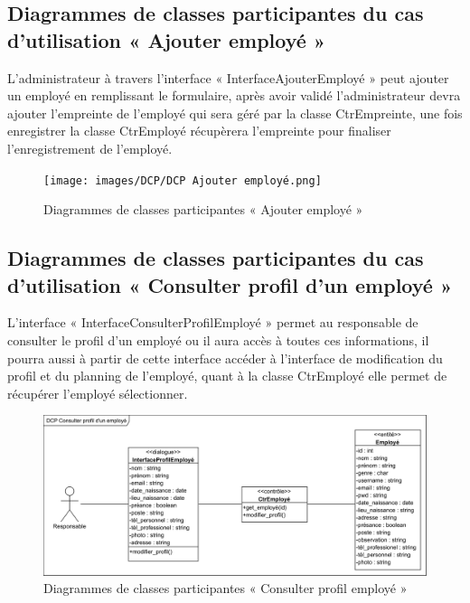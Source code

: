         \subsection*{Diagrammes de classes participantes du cas d'utilisation « Ajouter employé »}
        L’administrateur à travers l’interface « InterfaceAjouterEmployé » peut ajouter un employé en remplissant le formulaire, après avoir validé l’administrateur devra ajouter l’empreinte de l’employé qui sera géré par la classe CtrEmpreinte, une fois enregistrer la classe CtrEmployé récupèrera l’empreinte pour finaliser l’enregistrement de l’employé. 
        \clearpage
            \begin{figure}[h!]
                 \centering
                \texttt{[image: images/DCP/DCP Ajouter employé.png]}
                 \caption{Diagrammes de classes participantes « Ajouter employé »}
                 \label{fig31}
            \end{figure}
        
        \subsection*{Diagrammes de classes participantes du cas d'utilisation « Consulter profil d'un employé »}
        L’interface « InterfaceConsulterProfilEmployé » permet au responsable de consulter le profil d’un employé ou il aura accès à toutes ces informations, il pourra aussi à partir de cette interface accéder à l’interface de modification du profil et du planning de l’employé, quant à la classe CtrEmployé elle permet de récupérer l’employé sélectionner. 
            \begin{figure}[h!]
                 \centering
                \includegraphics[scale=0.72]{images/DCP/DCP_consulter_profil_d'un_employe.png}
                 \caption{Diagrammes de classes participantes « Consulter profil employé »}
                 \label{fig32}
            \end{figure}
             
